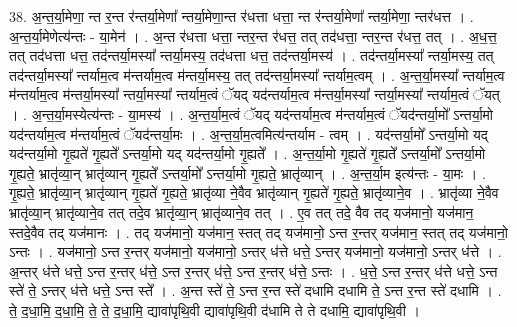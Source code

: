 \documentclass[17pt]{extarticle}
\begin{document}
38. अ॒न्त॒र्या॒मेणा॒ न्त र॒न्त र॑न्तर्या॒मेणा᳚ न्तर्या॒मेणा॒न्त र॑धत्ता धत्ता॒ न्त र॑न्तर्या॒मेणा᳚ न्तर्या॒मेणा॒ 
न्तर॑धत्त । . अ॒न्त॒र्या॒मेणेत्य॑न्तः - या॒मेन॑ । . अ॒न्त र॑धत्ता धत्ता॒ न्तर॒न्त र॑धत्त॒ तत् तद॑धत्ता॒ न्तर॒न्त र॑धत्त॒ तत् । . अ॒ध॒त्त॒ तत् तद॑धत्ता धत्त॒ तद॑न्तर्या॒मस्या᳚ न्तर्या॒मस्य॒ तद॑धत्ता धत्त॒ तद॑न्तर्या॒मस्य॑ । . तद॑न्तर्या॒मस्या᳚ न्तर्या॒मस्य॒ तत् तद॑न्तर्या॒मस्या᳚ न्तर्याम॒त्व म॑न्तर्याम॒त्व म॑न्तर्या॒मस्य॒ तत् तद॑न्तर्या॒मस्या᳚ न्तर्याम॒त्वम् । . अ॒न्त॒र्या॒मस्या᳚ न्तर्याम॒त्व म॑न्तर्याम॒त्व म॑न्तर्या॒मस्या᳚ न्तर्या॒मस्या᳚ न्तर्याम॒त्वं ॅयद् यद॑न्तर्याम॒त्व म॑न्तर्या॒मस्या᳚ न्तर्या॒मस्या᳚ न्तर्याम॒त्वं ॅयत् । . अ॒न्त॒र्या॒मस्येत्य॑न्तः - या॒मस्य॑ । . अ॒न्त॒र्या॒म॒त्वं ॅयद् यद॑न्तर्याम॒त्व म॑न्तर्याम॒त्वं ॅयद॑न्तर्या॒मो᳚ ऽन्तर्या॒मो यद॑न्तर्याम॒त्व म॑न्तर्याम॒त्वं ॅयद॑न्तर्या॒मः । . अ॒न्त॒र्या॒म॒त्वमित्य॑न्तर्याम - त्वम् । . यद॑न्तर्या॒मो᳚ ऽन्तर्या॒मो यद् यद॑न्तर्या॒मो गृ॒ह्यते॑ गृ॒ह्यते᳚ ऽन्तर्या॒मो यद् यद॑न्तर्या॒मो गृ॒ह्यते᳚ । . अ॒न्त॒र्या॒मो गृ॒ह्यते॑ गृ॒ह्यते᳚ ऽन्तर्या॒मो᳚ ऽन्तर्या॒मो गृ॒ह्यते॒ भ्रातृ॑व्या॒न् भ्रातृ॑व्यान् गृ॒ह्यते᳚ ऽन्तर्या॒मो᳚ ऽन्तर्या॒मो गृ॒ह्यते॒ भ्रातृ॑व्यान् । . अ॒न्त॒र्या॒म इत्य॑न्तः - या॒मः । . गृ॒ह्यते॒ भ्रातृ॑व्या॒न् भ्रातृ॑व्यान् गृ॒ह्यते॑ गृ॒ह्यते॒ भ्रातृ॑व्या ने॒वैव भ्रातृ॑व्यान् गृ॒ह्यते॑ गृ॒ह्यते॒ भ्रातृ॑व्याने॒व । . भ्रातृ॑व्या ने॒वैव भ्रातृ॑व्या॒न् भ्रातृ॑व्याने॒व तत् तदे॒व भ्रातृ॑व्या॒न् भ्रातृ॑व्याने॒व तत् । . ए॒व तत् तदे॒ वैव तद् यज॑मानो॒ यज॑मान॒ स्तदे॒वैव तद् यज॑मानः । . तद् यज॑मानो॒ यज॑मान॒ स्तत् तद् यज॑मानो॒ ऽन्त र॒न्तर् यज॑मान॒ स्तत् तद् यज॑मानो॒ ऽन्तः । . यज॑मानो॒ ऽन्त र॒न्तर् यज॑मानो॒ यज॑मानो॒ ऽन्तर् ध॑त्ते धत्ते॒ ऽन्तर् यज॑मानो॒ यज॑मानो॒ ऽन्तर् ध॑त्ते । . अ॒न्तर् ध॑त्ते धत्ते॒ ऽन्त र॒न्तर् ध॑त्ते॒ ऽन्त र॒न्तर् ध॑त्ते॒ ऽन्त र॒न्तर् ध॑त्ते॒ ऽन्तः । . ध॒त्ते॒ ऽन्त र॒न्तर् ध॑त्ते धत्ते॒ ऽन्त स्ते॑ ते॒ ऽन्तर् ध॑त्ते धत्ते॒ ऽन्त स्ते᳚ । . अ॒न्त स्ते॑ ते॒ ऽन्त र॒न्त स्ते॑ दधामि दधामि ते॒ ऽन्त र॒न्त स्ते॑ दधामि । . ते॒ द॒धा॒मि॒ द॒धा॒मि॒ ते॒ ते॒ द॒धा॒मि॒ द्यावा॑पृथि॒वी द्यावा॑पृथि॒वी द॑धामि ते ते दधामि॒ द्यावा॑पृथि॒वी । \newline
\pagebreak
{}
\end{document}
